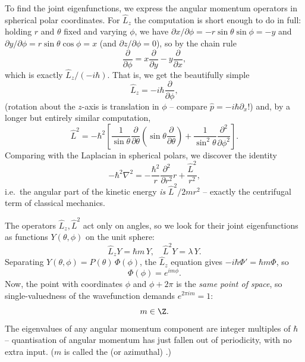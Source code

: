 To find the joint eigenfunctions, we express the angular momentum operators in spherical polar coordinates. For $\hat{L}_z$ the computation is short enough to do in full: holding $r$ and $\theta$ fixed and varying $\phi$, we have $\partial x/\partial \phi = -r\sin\theta\sin\phi = -y$ and $\partial y / \partial \phi = r \sin\theta\cos\phi = x$ (and $\partial z/\partial\phi = 0$), so by the chain rule
$$
\frac{\partial}{\partial \phi} = x \frac{\partial}{\partial y} - y \frac{\partial}{\partial x},
$$
which is exactly $\hat{L}_z / (-i\hbar)$. That is, we get the beautifully simple
$$
\hat{L}_z = -i\hbar \frac{\partial}{\partial \phi},
$$
(rotation about the $z$-axis is translation in $\phi$ -- compare $\hat p = -i\hbar\partial_x$!) and, by a longer but entirely similar computation,
$$
\hat{L}^2 = -\hbar^2 \left[ \frac{1}{\sin\theta} \frac{\partial}{\partial \theta}\left( \sin \theta \frac{\partial}{\partial \theta} \right) + \frac{1}{\sin^2\theta} \frac{\partial^2}{\partial \phi^2} \right].
$$
Comparing with the Laplacian in spherical polars, we discover the identity
$$
-\hbar^2 \nabla^2 = -\frac{\hbar^2}{r}\frac{\partial^2}{\partial r^2} r + \frac{\hat{L}^2}{r^2},
$$
i.e.\ the angular part of the kinetic energy \emph{is} $\hat{L}^2 / 2mr^2$ -- exactly the centrifugal term of classical mechanics.

The operators $\hat L_z, \hat L^2$ act only on angles, so we look for their joint eigenfunctions as functions $Y(\theta, \phi)$ on the unit sphere:
$$
\hat{L}_z Y = \hbar m \, Y, \quad \hat{L}^2 Y = \lambda \, Y.
$$
Separating $Y(\theta, \phi) = P(\theta) \, \Phi(\phi)$, the $\hat{L}_z$ equation gives $-i\hbar \Phi' = \hbar m \Phi$, so
$$
\Phi(\phi) = e^{i m \phi}.
$$
Now, the point with coordinates $\phi$ and $\phi + 2\pi$ is the \emph{same point of space}, so single-valuedness of the wavefunction demands $e^{2\pi i m} = 1$:
$$
m \in \Z.
$$
The eigenvalues of any angular momentum component are integer multiples of $\hbar$ -- quantisation of angular momentum has just fallen out of periodicity, with no extra input. ($m$ is called the  (or azimuthal) .)

